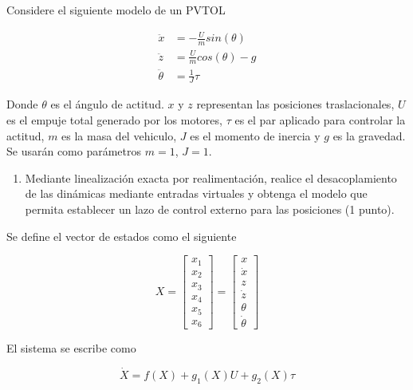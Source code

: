 \small
\vspace{0.5cm}
Considere el siguiente modelo de un PVTOL

\begin{equation*}
    \begin{aligned}
        \ddot{x}&=-\frac{U}{m}sin(\theta)\\
        \ddot{z}&=\frac{U}{m}cos(\theta)-g\\
        \ddot{\theta}&=\frac{1}{J}\tau
    \end{aligned}
\end{equation*}

Donde \(\theta\) es el ángulo de actitud. \({x}\) y \({z}\) representan las posiciones traslacionales, \(U\) es el empuje total generado por los motores, \(\tau\) es el par aplicado para controlar la actitud, \(m\) es la masa del vehiculo, \(J\) es el momento de inercia y \(g\) es la gravedad. Se usarán como parámetros \(m = 1\), \(J = 1\).

\begin{enumerate}
    \item Mediante linealización exacta por realimentación, realice el desacoplamiento de las dinámicas mediante entradas virtuales y obtenga el modelo que permita establecer un lazo de control externo para las posiciones (1 punto).
\end{enumerate}

Se define el vector de estados como el siguiente

\begin{equation*}
    X=\begin{bmatrix}
        x_1\\x_2\\x_3\\x_4\\x_5\\x_6
    \end{bmatrix}=\begin{bmatrix}
        x\\\dot{x}\\z\\\dot{z}\\\theta\\\dot{\theta}
    \end{bmatrix}
\end{equation*}

El sistema se escribe como

\begin{equation*}
    \dot{X}=f(X)+g_1(X)U+g_2(X)\tau
\end{equation*}

